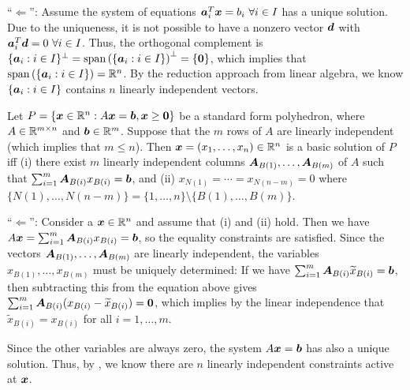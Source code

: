 \begin{enumerate}
\begin{pf}
``\(\Leftarrow\)'': Assume the system of equations
\(\bm{a}_i^{T}\bm{x}=b_i~\forall i\in I\) has a unique solution.  Due to
the uniqueness, it is not possible to have a nonzero vector \(\bm{d}\) with
\(\bm{a}_i^{T}\bm{d}=0~\forall i\in I\). Thus, the orthogonal complement is
\(\{\bm{a}_i:i\in I\}^{\perp}=\operatorname{span}\left(\{\bm{a}_i:i\in I\}\right)^{\perp}=\{\bm{0}\}\),
which implies that \(\operatorname{span}\left(\{\bm{a}_i:i\in I\}\right)=\mathbb{R}^n\). By the reduction
approach from linear algebra, we know \(\{\bm{a}_i:i\in I\}\) contains \(n\)
linearly independent vectors.
\end{pf}
\begin{theorem}
\label{thm:std-form-basic-sol}
Let \(P=\{\bm{x}\in\mathbb{R}^n:A\bm{x}=\bm{b}, \bm{x}\ge\bm{0}\}\) be a
standard form polyhedron, where \(A\in\mathbb{R}^{m\times n}\) and \(\bm{b}\in\mathbb{R}^m\).
Suppose that the \(m\) rows of \(A\) are linearly independent (which implies
that \(m\le n\)). Then \(\bm{x}=(x_1,\dotsc,x_n)\in\mathbb{R}^n\) is a basic solution
of \(P\) iff (i) there exist \(m\) linearly independent columns
\(\bm{A}_{B(1)},\dotsc,\bm{A}_{B(m)}\) of \(A\) such that
\(\sum_{i=1}^{m}\bm{A}_{B(i)}x_{B(i)}=\bm{b}\), and
(ii) \(x_{N(1)}=\dotsb=x_{N(n-m)}=0\) where
\(\{N(1),\dotsc,N(n-m)\}=\{1,\dotsc,n\}\setminus \{B(1),\dotsc,B(m)\}\).
\end{theorem}
\begin{pf}
``\(\Leftarrow\)'': Consider a \(\bm{x}\in\mathbb{R}^n\) and assume that (i) and (ii)
hold. Then we have
\(A\bm{x}=\sum_{i=1}^{m}\bm{A}_{B(i)}x_{B(i)}=\bm{b}\), so the equality
constraints are satisfied. Since the vectors
\(\bm{A}_{B(1)},\dotsc,\bm{A}_{B(m)}\) are linearly independent, the
variables \(x_{B(1)},\dotsc,x_{B(m)}\) must be uniquely determined: If we have
\(\sum_{i=1}^{m}\bm{A}_{B(i)}\widetilde{x}_{B(i)}=\bm{b}\), then
subtracting this from the equation above gives
\(\sum_{i=1}^{m}\bm{A}_{B(i)}(x_{B(i)}-\widetilde{x}_{B(i)})=\bm{0}\),
which implies by the linear independence that \(\widetilde{x}_{B(i)}=x_{B(i)}\)
for all \(i=1,\dotsc,m\).

Since the other variables are always zero, the system \(A\bm{x}=\bm{b}\)
has also a unique solution. Thus, by , we
know there are \(n\) linearly independent constraints active at \(\bm{x}\).


\end{pf}
\end{enumerate}
